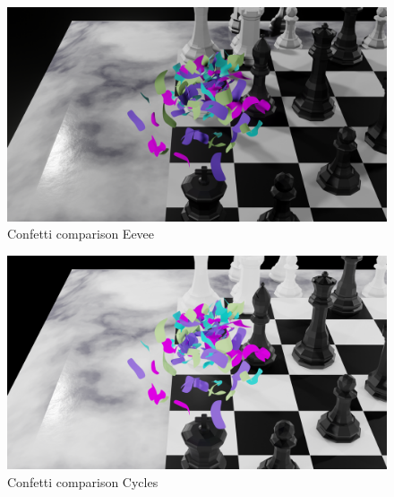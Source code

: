 \documentclass[11pt]{article}
\begin{document}
\begin{figure}[htbp]
\centering
\includegraphics[width=\textwidth]{Images/confetti-eevee.png}
\caption{\label{confetti-eevee}Confetti comparison Eevee}
\end{figure}

\begin{figure}[htbp]
\centering
\includegraphics[width=\textwidth]{Images/confetti-cycles.png}
\caption{\label{confetti-cycles}Confetti comparison Cycles}
\end{figure}
\end{document}
